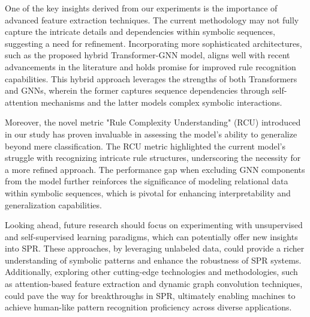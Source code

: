\documentclass{article}
\begin{document}
One of the key insights derived from our experiments is the importance of advanced feature extraction techniques. The current methodology may not fully capture the intricate details and dependencies within symbolic sequences, suggesting a need for refinement. Incorporating more sophisticated architectures, such as the proposed hybrid Transformer-GNN model, aligns well with recent advancements in the literature and holds promise for improved rule recognition capabilities. This hybrid approach leverages the strengths of both Transformers and GNNs, wherein the former captures sequence dependencies through self-attention mechanisms and the latter models complex symbolic interactions.

Moreover, the novel metric "Rule Complexity Understanding" (RCU) introduced in our study has proven invaluable in assessing the model's ability to generalize beyond mere classification. The RCU metric highlighted the current model's struggle with recognizing intricate rule structures, underscoring the necessity for a more refined approach. The performance gap when excluding GNN components from the model further reinforces the significance of modeling relational data within symbolic sequences, which is pivotal for enhancing interpretability and generalization capabilities.

Looking ahead, future research should focus on experimenting with unsupervised and self-supervised learning paradigms, which can potentially offer new insights into SPR. These approaches, by leveraging unlabeled data, could provide a richer understanding of symbolic patterns and enhance the robustness of SPR systems. Additionally, exploring other cutting-edge technologies and methodologies, such as attention-based feature extraction and dynamic graph convolution techniques, could pave the way for breakthroughs in SPR, ultimately enabling machines to achieve human-like pattern recognition proficiency across diverse applications.



\end{document}
